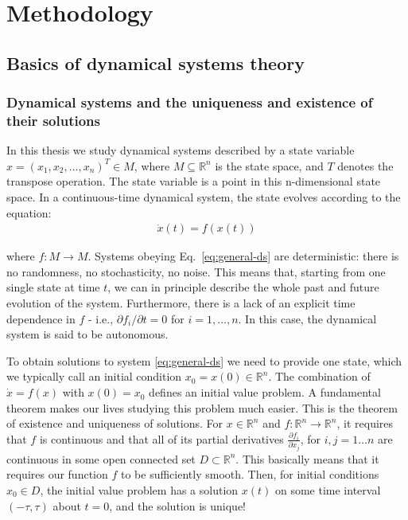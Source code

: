 \chapter{Methodology}\label{chap:methodology}

\section{Basics of dynamical systems theory}

\subsection{Dynamical systems and the uniqueness and existence of their solutions}
In this thesis we study dynamical systems described by a state variable $x = (x_1, x_2, \ldots, x_n)^T \in M $, where $M \subseteq \mathbb{R}^n$ is the state space, and $T$ denotes the transpose operation. The state variable is a point in this n-dimensional state space. In a continuous-time dynamical system, the state evolves according to the equation:
%
\begin{align}
    \dot{x}(t) = f(x(t))
    \label{eq:general-ds}
\end{align}

where $f:M\to M$. Systems obeying Eq.~\ref{eq:general-ds} are deterministic: there is no randomness, no stochasticity, no noise. This means that, starting from one single state at time $t$, we can in principle describe the whole past and future evolution of the system. Furthermore, there is a lack of an explicit time dependence in $f$ - i.e., ${\partial f_i}/{\partial t} = 0$ for $i=1, \ldots, n$. In this case, the dynamical system is said to be autonomous. 

To obtain solutions to system \ref{eq:general-ds} we need to provide one state, which we typically call an initial condition $x_0 = x(0) \in \mathbb{R}^n$. The combination of $\dot{x} = f(x)$ with $x(0) = x_0$ defines an initial value problem. A fundamental theorem makes our lives studying this problem much easier. This is the theorem of existence and uniqueness of solutions. For $x \in \mathbb{R}^n$ and $f:\mathbb{R}^n\to\mathbb{R}^n$, it requires that $f$ is continuous and that all of its partial derivatives $\frac{\partial f_i}{\partial x_j}$, for $i, j = 1\ldots n$ are continuous in some open connected set $D \subset \mathbb{R}^n$. This basically means that it requires our function $f$ to be sufficiently smooth. Then, for initial conditions $x_0 \in D$, the initial value problem has a solution $x(t)$ on some time interval $(-\tau, \tau)$ about $t=0$, and the solution is unique! \cite{strogatz2002nonlinear} 

